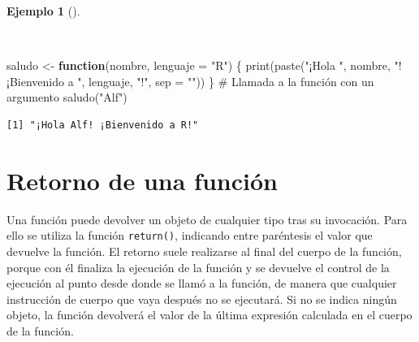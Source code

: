 \documentclass[
  spanish,
  a4paper,
]{scrreport}
\newenvironment{Shaded}{\begin{snugshade}}{\end{snugshade}}
\newcommand{\AttributeTok}[1]{\textcolor[rgb]{0.40,0.45,0.13}{#1}}
\newcommand{\CommentTok}[1]{\textcolor[rgb]{0.37,0.37,0.37}{#1}}
\newcommand{\ControlFlowTok}[1]{\textcolor[rgb]{0.00,0.23,0.31}{\textbf{#1}}}
\newcommand{\FunctionTok}[1]{\textcolor[rgb]{0.28,0.35,0.67}{#1}}
\newcommand{\NormalTok}[1]{\textcolor[rgb]{0.00,0.23,0.31}{#1}}
\newcommand{\OtherTok}[1]{\textcolor[rgb]{0.00,0.23,0.31}{#1}}
\newcommand{\StringTok}[1]{\textcolor[rgb]{0.13,0.47,0.30}{#1}}
\theoremstyle{definition}
\theoremstyle{definition}
\newtheorem{example}{Ejemplo}[chapter]
\theoremstyle{remark}
\begin{document}
\begin{example}[]\protect\hypertarget{exm-argumento-defecto-funcion}{}\label{exm-argumento-defecto-funcion}

~

\begin{Shaded}
\begin{Highlighting}[]
\NormalTok{saludo }\OtherTok{\textless{}{-}} \ControlFlowTok{function}\NormalTok{(nombre, }\AttributeTok{lenguaje =} \StringTok{"R"}\NormalTok{) \{}
  \FunctionTok{print}\NormalTok{(}\FunctionTok{paste}\NormalTok{(}\StringTok{"¡Hola "}\NormalTok{, nombre, }\StringTok{"! ¡Bienvenido a "}\NormalTok{, lenguaje, }\StringTok{"!"}\NormalTok{, }\AttributeTok{sep =} \StringTok{""}\NormalTok{))}
\NormalTok{\}}
\CommentTok{\# Llamada a la función con un argumento}
\FunctionTok{saludo}\NormalTok{(}\StringTok{"Alf"}\NormalTok{)}
\end{Highlighting}
\end{Shaded}

\begin{verbatim}
[1] "¡Hola Alf! ¡Bienvenido a R!"
\end{verbatim}

\end{example}

\section{Retorno de una función}\label{retorno-de-una-funciuxf3n}

Una función puede devolver un objeto de cualquier tipo tras su
invocación. Para ello se utiliza la función \texttt{return()}, indicando
entre paréntesis el valor que devuelve la función. El retorno suele
realizarse al final del cuerpo de la función, porque con él finaliza la
ejecución de la función y se devuelve el control de la ejecución al
punto desde donde se llamó a la función, de manera que cualquier
instrucción de cuerpo que vaya después no se ejecutará. Si no se indica
ningún objeto, la función devolverá el valor de la última expresión
calculada en el cuerpo de la función.
\end{document}
